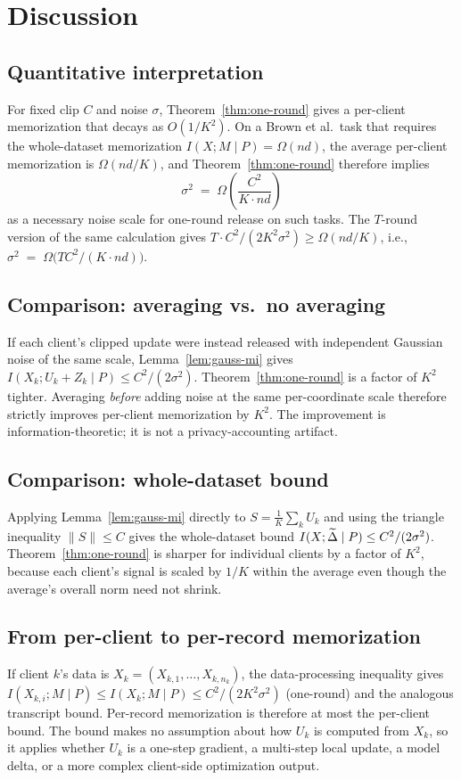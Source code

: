 \section{Discussion}\label{sec:discuss}

\subsection{Quantitative interpretation}
For fixed clip \(C\) and noise \(\sigma\), Theorem~\ref{thm:one-round} gives a per-client memorization that decays as \(O(1/K^2)\). On a Brown et al.\ task that requires the whole-dataset memorization \(I(X;M\mid P)=\Omega(nd)\), the average per-client memorization is \(\Omega(nd/K)\), and Theorem~\ref{thm:one-round} therefore implies
\[
\sigma^2 \;=\; \Omega\!\left(\frac{C^2}{K\cdot nd}\right)
\]
as a necessary noise scale for one-round release on such tasks. The \(T\)-round version of the same calculation gives \(T\cdot C^2/(2K^2\sigma^2)\ge \Omega(nd/K)\), i.e., \(\sigma^2 \;=\; \Omega\!\bigl(T C^2/(K\cdot nd)\bigr)\).

\subsection{Comparison: averaging vs.\ no averaging}
If each client's clipped update were instead released with independent Gaussian noise of the same scale, Lemma~\ref{lem:gauss-mi} gives \(I(X_k;U_k+Z_k\mid P)\le C^2/(2\sigma^2)\). Theorem~\ref{thm:one-round} is a factor of \(K^2\) tighter. Averaging \emph{before} adding noise at the same per-coordinate scale therefore strictly improves per-client memorization by \(K^2\). The improvement is information-theoretic; it is not a privacy-accounting artifact.

\subsection{Comparison: whole-dataset bound}
Applying Lemma~\ref{lem:gauss-mi} directly to \(S=\tfrac{1}{K}\sum_k U_k\) and using the triangle inequality \(\|S\|\le C\) gives the whole-dataset bound \(I(X;\widetilde{\Delta}\mid P)\le C^2/(2\sigma^2)\). Theorem~\ref{thm:one-round} is sharper for individual clients by a factor of \(K^2\), because each client's signal is scaled by \(1/K\) within the average even though the average's overall norm need not shrink.

\subsection{From per-client to per-record memorization}
If client \(k\)'s data is \(X_k=(X_{k,1},\dots,X_{k,n_k})\), the data-processing inequality gives
\(I(X_{k,i};M\mid P) \le I(X_k;M\mid P) \le C^2/(2K^2\sigma^2)\) (one-round) and the analogous transcript bound. Per-record memorization is therefore at most the per-client bound. The bound makes no assumption about how \(U_k\) is computed from \(X_k\), so it applies whether \(U_k\) is a one-step gradient, a multi-step local update, a model delta, or a more complex client-side optimization output.

